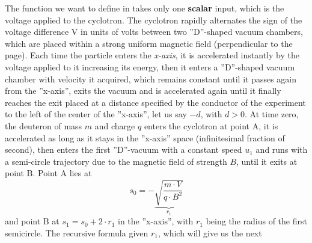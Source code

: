 \documentclass[10pt]{article}
\newcommand{\dsp}{\displaystyle}
\newcommand{\matlab}{\text{\color{red}matlab }}
\begin{document}
\begin{center}
\end{center}
The function we want to define in \matlab takes only one \textbf{scalar} input, which is 
the voltage applied to the cyclotron. The cyclotron rapidly alternates the sign of the 
voltage difference V in units of volts between two ''D''-shaped vacuum chambers, which 
are placed within a strong uniform magnetic field (perpendicular to the page). Each time 
the particle enters the \textit{x-axis}, it is accelerated instantly by the voltage 
applied to it increasing its energy, then it enters a ''D''-shaped vacuum chamber with 
velocity it acquired, which remains constant until it passes again from the ''x-axis'', 
exits the vacuum and is accelerated again until it finally reaches the exit placed at a 
distance specified by the conductor of the experiment to the left of the center of the 
''x-axis'', let us say $-d$, with $d>0$. At time zero, the deuteron of mass $m$ and 
charge $q$  enters the cyclotron at point A, it is accelerated as long as  it stays in 
the ''x-axis'' space (infinitesimal fraction of second), then enters the first 
''D''-vacuum with a constant speed $u_{1}$ and runs with a semi-circle trajectory due to 
the magnetic field of strength $B$, until it exits at point B. Point A lies at \[s_{0} 
= -\underbrace{\sqrt{\frac{m\cdot V}{q\cdot B^2}}}_{r_{1}}\]  and point 
B at $\dsp s_{1} = s_{0}+2\cdot r_{1}$ in the ''x-axis'', with $r_{1}$ being the radius 
of the first semicircle. The recursive formula given $r_1$, which will give us the next 
\end{document}
